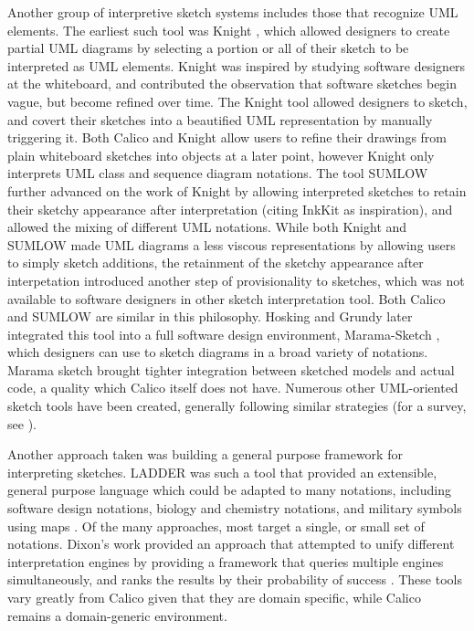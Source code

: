 \documentclass[12pt,fleqn]{ucithesis}
\begin{document}
Another group of interpretive sketch systems includes those that recognize UML elements. The earliest such tool was Knight \citep{damm2000tool}, which allowed  designers to create partial UML diagrams by selecting a portion or all of their sketch to be interpreted as UML elements. Knight was inspired by studying software designers at the whiteboard, and contributed the observation that software sketches begin vague, but become refined over time. The Knight tool allowed designers to sketch, and covert their sketches into a beautified UML representation by manually triggering it. Both Calico and Knight allow users to refine their drawings from plain whiteboard sketches into objects at a later point, however Knight only interprets UML class and sequence diagram notations. The tool SUMLOW \citep{chen2008sumlow} further advanced on the work of Knight by allowing interpreted sketches to retain their sketchy appearance after interpretation (citing InkKit as inspiration), and allowed the mixing of different UML notations. While both Knight and SUMLOW made UML diagrams a less viscous representations by allowing users to simply sketch additions, the retainment of the sketchy appearance after interpetation introduced another step of provisionality to sketches, which was not available to software designers in other sketch interpretation tool. Both Calico and SUMLOW are similar in this philosophy. Hosking and Grundy later integrated this tool into a full software design environment, Marama-Sketch \citep{Grundy}, which designers can use to sketch diagrams in a broad variety of notations. Marama sketch brought tighter integration between sketched models and actual code, a quality which Calico itself does not have. Numerous other UML-oriented sketch tools have been created, generally following similar strategies (for a survey, see \citep{Johnson}). 

Another approach taken was building a general purpose framework for interpreting sketches. LADDER was such a tool that provided an extensible, general purpose language which could be adapted to many notations, including software design notations, biology and chemistry notations, and military symbols using maps \cite{hammond2006ladder}. Of the many approaches, most target a single, or small set of notations. Dixon's work provided an approach that attempted to unify different interpretation engines by providing a framework that queries multiple engines simultaneously, and ranks the results by their probability of success \cite{dixon2008whiteboards}. These tools vary greatly from Calico given that they are domain specific, while Calico remains a domain-generic environment.
\end{document}
